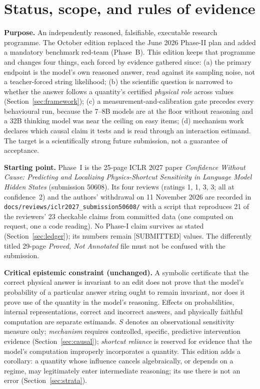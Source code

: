 \documentclass[10pt,a4paper]{article}
\newcommand{\tg}[1]{\textsc{[#1]}}
\begin{document}
\section{Status, scope, and rules of evidence}
\label{sec:status}

\textbf{Purpose.} An independently reasoned, falsifiable, executable research programme. The October edition
replaced the June 2026 Phase-II plan and added a mandatory benchmark red-team (Phase~B). This edition keeps that
programme and changes four things, each forced by evidence gathered since: (a) the primary endpoint is the model's
own reasoned answer, read against its sampling noise, not a teacher-forced string likelihood; (b) the scientific
question is narrowed to whether the answer follows a quantity's certified \emph{physical role} across values
(Section~\ref{sec:framework}); (c) a measurement-and-calibration gate precedes every behavioural run, because the
7--8B models are at the floor without reasoning and a 32B thinking model was near the ceiling on easy items; (d)
mechanism work declares which causal claim it tests and is read through an interaction estimand. The target is a
scientifically strong future submission, not a guarantee of acceptance.

\textbf{Starting point.} Phase~I is the 25-page ICLR 2027 paper \emph{Confidence Without Cause: Predicting and
Localizing Physics-Shortcut Sensitivity in Language Model Hidden States} (submission 50608). Its four reviews
(ratings 1, 1, 3, 3; all at confidence~2) and the authors' withdrawal on 11 November 2026 are recorded in
\texttt{docs/reviews/iclr2027\_submission50608/} with a script that reproduces 21 of the reviewers' 23 checkable
claims from committed data (one computed on request, one a code reading). No Phase-I claim survives as stated
(Section~\ref{sec:ledger}); its numbers remain \tg{SUBMITTED} values. The differently titled 29-page \emph{Proved,
Not Annotated} file must not be confused with the submission.

\textbf{Critical epistemic constraint (unchanged).} A symbolic certificate that the correct physical answer is
invariant to an edit does not prove that the model's probability of a particular answer string ought to remain
invariant, nor does it prove use of the quantity in the model's reasoning. Effects on probabilities, internal
representations, correct and incorrect answers, and physically faithful computation are separate estimands.
$S$ denotes an observational sensitivity measure only; \emph{mechanism} requires controlled, specific, predictive
intervention evidence (Section~\ref{sec:causal}); \emph{shortcut reliance} is reserved for evidence that the
model's computation improperly incorporates a quantity. This edition adds a corollary: a quantity whose influence
cancels algebraically, or depends on a regime, may legitimately enter intermediate reasoning; its use there is
not an error (Section~\ref{sec:strata}).
\end{document}
